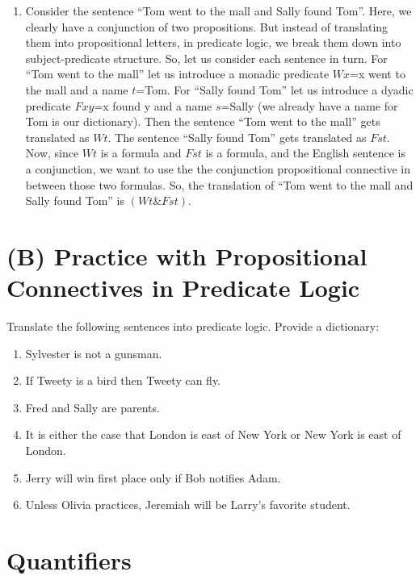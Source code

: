 \documentclass[
]{book}
\providecommand{\tightlist}{%
  \setlength{\itemsep}{0pt}\setlength{\parskip}{0pt}}
\begin{document}
\begin{enumerate}
\def\labelenumi{\arabic{enumi}.}
\tightlist
\item
  Consider the sentence ``Tom went to the mall and Sally found Tom''. Here, we clearly have a conjunction of two propositions. But instead of translating them into propositional letters, in predicate logic, we break them down into subject-predicate structure. So, let us consider each sentence in turn. For ``Tom went to the mall'' let us introduce a monadic predicate \(Wx\)=x went to the mall and a name \(t\)=Tom. For ``Sally found Tom'' let us introduce a dyadic predicate \(Fxy\)=x found y and a name \(s\)=Sally (we already have a name for Tom is our dictionary). Then the sentence ``Tom went to the mall'' gets translated as \(Wt\). The sentence ``Sally found Tom'' gets translated as \(Fst\). Now, since \(Wt\) is a formula and \(Fst\) is a formula, and the English sentence is a conjunction, we want to use the the conjunction propositional connective in between those two formulas. So, the translation of ``Tom went to the mall and Sally found Tom'' is \((Wt \& Fst)\).
\end{enumerate}

\hypertarget{b-practice-with-propositional-connectives-in-predicate-logic}{%
\section{(B) Practice with Propositional Connectives in Predicate Logic}\label{b-practice-with-propositional-connectives-in-predicate-logic}}

Translate the following sentences into predicate logic. Provide a dictionary:

\begin{enumerate}
\def\labelenumi{\arabic{enumi}.}
\tightlist
\item
  Sylvester is not a gunsman.
\item
  If Tweety is a bird then Tweety can fly.
\item
  Fred and Sally are parents.
\item
  It is either the case that London is east of New York or New York is east of London.
\item
  Jerry will win first place only if Bob notifies Adam.
\item
  Unless Olivia practices, Jeremiah will be Larry's favorite student.
\end{enumerate}

\hypertarget{quantifiers}{%
\section{Quantifiers}\label{quantifiers}}
\end{document}
